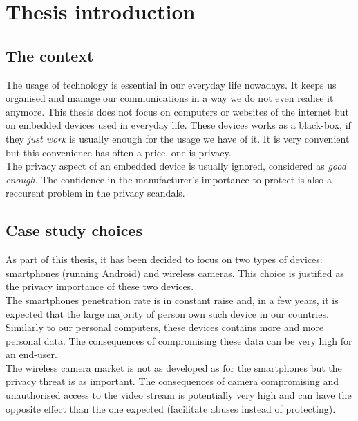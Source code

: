 \chapter{Thesis introduction}

\section{The context}

The usage of technology is essential in our everyday life nowadays.
It keeps us organised and manage our communications in a way we do not even realise it anymore.
This thesis does not focus on computers or websites of the internet but on embedded devices used in everyday life.
These devices works as a black-box, if they \emph{just work} is usually enough for the usage we have of it.
It is very convenient but this convenience has often a price, one is privacy.\\

The privacy aspect of an embedded device is usually ignored, considered as \emph{good enough}.
The confidence in the manufacturer's importance to protect is also a reccurent problem in the privacy scandals.\\



\section{Case study choices}

As part of this thesis, it has been decided to focus on two types of devices: smartphones (running Android) and wireless cameras.
This choice is justified as the privacy importance of these two devices.\\

The smartphones penetration rate is in constant raise and, in a few years, it is expected that the large majority of person own such device in our countries.
Similarly to our personal computers, these devices contains more and more personal data.
The consequences of compromising these data can be very high for an end-user.\\

The wireless camera market is not as developed as for the smartphones but the privacy threat is as important.
The consequences of camera compromising and unauthorised access to the video stream is potentially very high and can have the opposite effect than the one expected (facilitate abuses instead of protecting).\\


